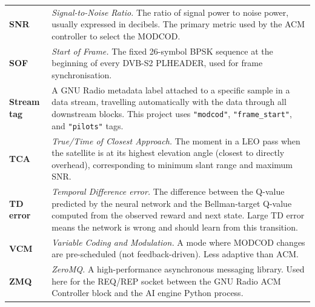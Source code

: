 \documentclass[12pt,a4paper]{report}
\begin{document}
\begin{longtable}{p{3.2cm}p{10.5cm}}
\textbf{SNR} & \textit{Signal-to-Noise Ratio.}  The ratio of signal power to
    noise power, usually expressed in decibels.  The primary metric used by
    the ACM controller to select the MODCOD. \\[4pt]

\textbf{SOF} & \textit{Start of Frame.}  The fixed 26-symbol BPSK sequence at
    the beginning of every DVB-S2 PLHEADER, used for frame synchronisation. \\[4pt]

\textbf{Stream tag} & A GNU Radio metadata label attached to a specific sample
    in a data stream, travelling automatically with the data through all
    downstream blocks.  This project uses \texttt{"modcod"}, \texttt{"frame\_start"},
    and \texttt{"pilots"} tags. \\[4pt]

\textbf{TCA} & \textit{True/Time of Closest Approach.}  The moment in a LEO
    pass when the satellite is at its highest elevation angle (closest to directly
    overhead), corresponding to minimum slant range and maximum SNR. \\[4pt]

\textbf{TD error} & \textit{Temporal Difference error.}  The difference between
    the Q-value predicted by the neural network and the Bellman-target Q-value
    computed from the observed reward and next state.  Large TD error means the
    network is wrong and should learn from this transition. \\[4pt]

\textbf{VCM} & \textit{Variable Coding and Modulation.}  A mode where MODCOD
    changes are pre-scheduled (not feedback-driven).  Less adaptive than ACM. \\[4pt]

\textbf{ZMQ} & \textit{ZeroMQ.}  A high-performance asynchronous messaging
    library.  Used here for the REQ/REP socket between the GNU Radio ACM
    Controller block and the AI engine Python process. \\[4pt]

\end{longtable}



\end{document}
